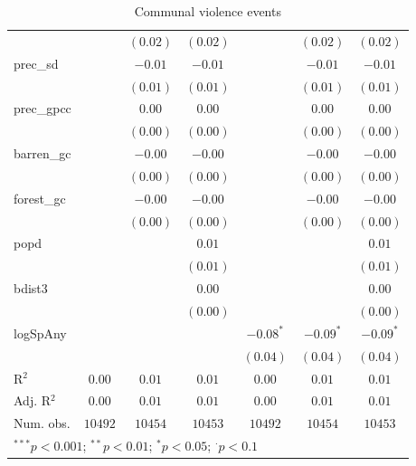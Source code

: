 \begin{sidewaystable}
\begin{center}
{\begin{tabular}{l c c c c c c}
                &               & $(0.02)$      & $(0.02)$     &               & $(0.02)$      & $(0.02)$        \\
prec\_sd        &               & $-0.01$       & $-0.01$      &               & $-0.01$       & $-0.01$         \\
                &               & $(0.01)$      & $(0.01)$     &               & $(0.01)$      & $(0.01)$        \\
prec\_gpcc      &               & $0.00$        & $0.00$       &               & $0.00$        & $0.00$          \\
                &               & $(0.00)$      & $(0.00)$     &               & $(0.00)$      & $(0.00)$        \\
barren\_gc      &               & $-0.00$       & $-0.00$      &               & $-0.00$       & $-0.00$         \\
                &               & $(0.00)$      & $(0.00)$     &               & $(0.00)$      & $(0.00)$        \\
forest\_gc      &               & $-0.00$       & $-0.00$      &               & $-0.00$       & $-0.00$         \\
                &               & $(0.00)$      & $(0.00)$     &               & $(0.00)$      & $(0.00)$        \\
popd            &               &               & $0.01$       &               &               & $0.01$          \\
                &               &               & $(0.01)$     &               &               & $(0.01)$        \\
bdist3          &               &               & $0.00$       &               &               & $0.00$          \\
                &               &               & $(0.00)$     &               &               & $(0.00)$        \\
logSpAny        &               &               &              & $-0.08^{*}$   & $-0.09^{*}$   & $-0.09^{*}$     \\
                &               &               &              & $(0.04)$      & $(0.04)$      & $(0.04)$        \\
\hline
R$^2$           & $0.00$        & $0.01$        & $0.01$       & $0.00$        & $0.01$        & $0.01$          \\
Adj. R$^2$      & $0.00$        & $0.01$        & $0.01$       & $0.00$        & $0.01$        & $0.01$          \\
Num. obs.       & $10492$       & $10454$       & $10453$      & $10492$       & $10454$       & $10453$         \\
\hline
\multicolumn{7}{l}{\scriptsize{$^{***}p<0.001$; $^{**}p<0.01$; $^{*}p<0.05$; $^{\cdot}p<0.1$}}
\end{tabular}
}
\caption{Communal violence events}
\label{org3}
\end{center}
\end{sidewaystable}

